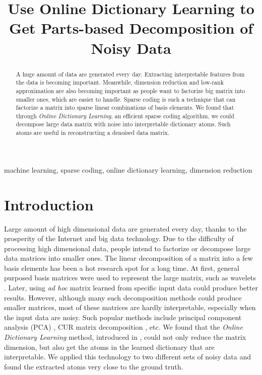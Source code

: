 \documentclass[conference]{IEEEtran}
\begin{document}
\title{Use Online Dictionary Learning to Get Parts-based Decomposition of Noisy Data}

\author{
}

\maketitle

\begin{abstract}
A huge amount of data are generated every day.
Extracting interpretable features from the data is becoming
important. Meanwhile, dimension reduction and low-rank approximation
are also becoming important as people want to
factorize big matrix into smaller ones, which are easier to handle.
Sparse coding is such a technique that can factorize a matrix into
sparse linear combinations of basis elements. We found that
through \textit{Online Dictionary Learning}, an efficient sparse coding
algorithm, we could decompose large data matrix with noise
into interpretable dictionary atoms. Such atoms are useful in
reconstructing a denoised data matrix.
\end{abstract}

\begin{IEEEkeywords}
machine learning, sparse coding, online dictionary learning, dimension reduction
\end{IEEEkeywords}

\section{Introduction}
Large amount of high dimensional data are generated every day, thanks to the prosperity of the Internet and big data technology. Due to the difficulty of processing high dimensional data, people intend to factorize or decompose large data matrices into smaller ones. The linear decomposition of a matrix into a few basis elements has been a hot research spot for a long time. At first, general purposed basis matrices were used to represent the large matrix, such as wavelets \cite{b1}. Later, using \textit{ad hoc} matrix learned from specific input data could produce better results. However, although many such decomposition methods could produce smaller matrices, most of these matrices are hardly interpretable, especially when the input data are noisy. Such popular methods include principal component analysis (PCA) \cite{b2}, CUR matrix decomposition \cite{b3}, etc. We found that the \textit{Online Dictionary Learning} method, introduced in \cite{b4}, could not only reduce the matrix dimension, but also get the atoms in the learned dictionary that are interpretable. We applied this technology to two different sets of noisy data and found the extracted atoms very close to the ground truth. 
\end{document}
